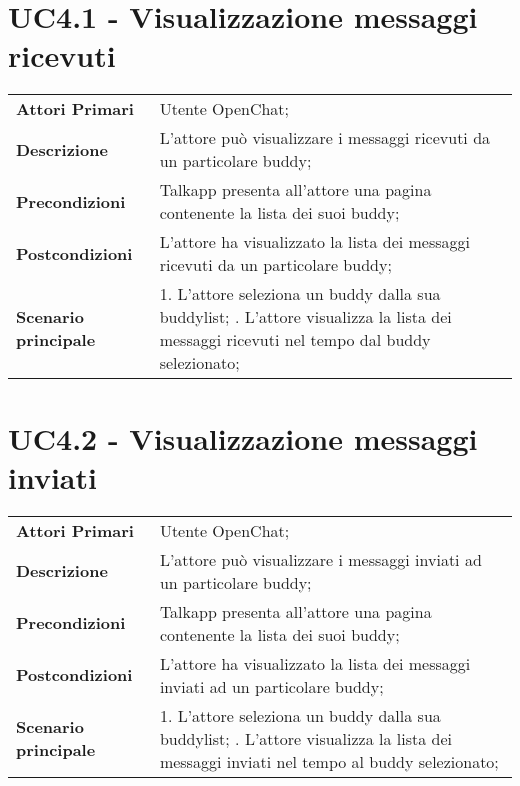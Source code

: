 \section{UC4.1 - Visualizzazione messaggi ricevuti}
	\begin{center}
	\bgroup
	\def\arraystretch{1.8}     
	\begin{longtable}{  p{4cm} | p{9.5cm} } 
		\textbf{Attori Primari} & Utente OpenChat; \\ 
		\textbf{Descrizione} &  L'attore può visualizzare i messaggi ricevuti da un particolare buddy; \\ 
		\textbf{Precondizioni}  & Talkapp presenta all'attore una pagina contenente la lista dei suoi buddy; \\
		\textbf{Postcondizioni} & L'attore ha visualizzato la lista dei messaggi ricevuti  da un particolare buddy;  \\ 
		\textbf{Scenario principale} & 
		1. L'attore seleziona un buddy dalla sua buddylist; \newline
		2. L'attore visualizza la lista dei messaggi ricevuti nel tempo dal buddy selezionato;
	\end{longtable}
	\egroup
\end{center}

\section{UC4.2 - Visualizzazione messaggi inviati}
	\begin{center}
	\bgroup
	\def\arraystretch{1.8}     
	\begin{longtable}{  p{4cm} | p{9.5cm} } 
		\textbf{Attori Primari} & Utente OpenChat; \\ 
		\textbf{Descrizione} &  L'attore può visualizzare i messaggi inviati ad un particolare buddy; \\ 
		\textbf{Precondizioni}  & Talkapp presenta all'attore una pagina contenente la lista dei suoi buddy; \\
		\textbf{Postcondizioni} & L'attore ha visualizzato la lista dei messaggi inviati  ad un particolare buddy;  \\ 
		\textbf{Scenario principale} & 
		1. L'attore seleziona un buddy dalla sua buddylist; \newline
		2. L'attore visualizza la lista dei messaggi inviati nel tempo al buddy selezionato;
	\end{longtable}
	\egroup
\end{center}

